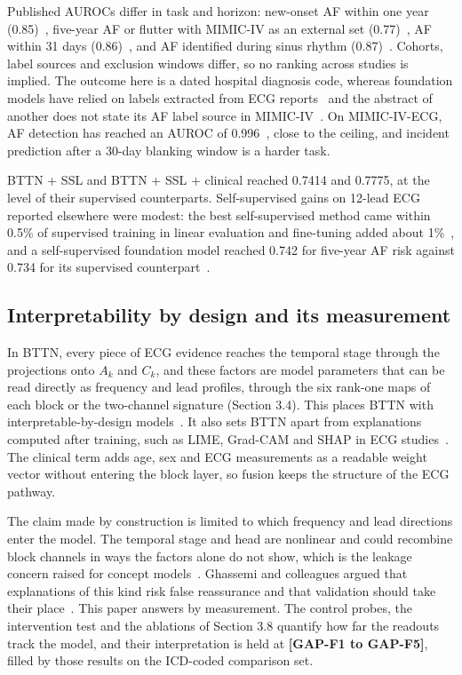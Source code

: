 \documentclass[preprint,12pt]{elsarticle}
\begin{document}
Published AUROCs differ in task and horizon: new-onset AF within one year (0.85)~\cite{raghunath2021}, five-year AF or flutter with MIMIC-IV as an external set (0.77)~\cite{jabbour2024}, AF within 31 days (0.86)~\cite{yuan2023}, and AF identified during sinus rhythm (0.87)~\cite{attia2019}. Cohorts, label sources and exclusion windows differ, so no ranking across studies is implied. The outcome here is a dated hospital diagnosis code, whereas foundation models have relied on labels extracted from ECG reports~\cite{nolinlapalme2026} and the abstract of another does not state its AF label source in MIMIC-IV~\cite{ko2026}. On MIMIC-IV-ECG, AF detection has reached an AUROC of 0.996~\cite{mckeen2025}, close to the ceiling, and incident prediction after a 30-day blanking window is a harder task.

BTTN + SSL and BTTN + SSL + clinical reached 0.7414 and 0.7775, at the level of their supervised counterparts. Self-supervised gains on 12-lead ECG reported elsewhere were modest: the best self-supervised method came within 0.5\% of supervised training in linear evaluation and fine-tuning added about 1\%~\cite{mehari2022}, and a self-supervised foundation model reached 0.742 for five-year AF risk against 0.734 for its supervised counterpart~\cite{nolinlapalme2026}.

\subsection{Interpretability by design and its measurement}

In BTTN, every piece of ECG evidence reaches the temporal stage through the projections onto $A_k$ and $C_k$, and these factors are model parameters that can be read directly as frequency and lead profiles, through the six rank-one maps of each block or the two-channel signature (Section 3.4). This places BTTN with interpretable-by-design models~\cite{rudin2019,koh2020,bohle2022}. It also sets BTTN apart from explanations computed after training, such as LIME, Grad-CAM and SHAP in ECG studies~\cite{hughes2021,storas2023,matsuo2026}. The clinical term adds age, sex and ECG measurements as a readable weight vector without entering the block layer, so fusion keeps the structure of the ECG pathway.

The claim made by construction is limited to which frequency and lead directions enter the model. The temporal stage and head are nonlinear and could recombine block channels in ways the factors alone do not show, which is the leakage concern raised for concept models~\cite{mahinpei2021,havasi2022}. Ghassemi and colleagues argued that explanations of this kind risk false reassurance and that validation should take their place~\cite{ghassemi2021}. This paper answers by measurement. The control probes, the intervention test and the ablations of Section 3.8 quantify how far the readouts track the model, and their interpretation is held at \textbf{[GAP-F1 to GAP-F5]}, filled by those results on the ICD-coded comparison set.
\end{document}

